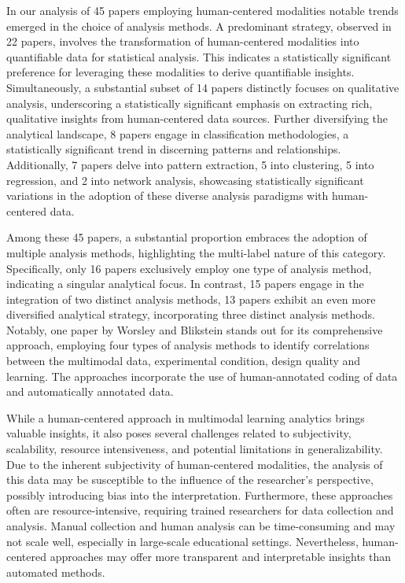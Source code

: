 \documentclass[manuscript,screen,review]{acmart}
\begin{document}
In our analysis of 45 papers employing human-centered modalities notable trends emerged in the choice of analysis methods. A predominant strategy, observed in 22 papers, involves the transformation of human-centered modalities into quantifiable data for statistical analysis. This indicates a statistically significant preference for leveraging these modalities to derive quantifiable insights. Simultaneously, a substantial subset of 14 papers distinctly focuses on qualitative analysis, underscoring a statistically significant emphasis on extracting rich, qualitative insights from human-centered data sources. Further diversifying the analytical landscape, 8 papers engage in classification methodologies, a statistically significant trend in discerning patterns and relationships. Additionally, 7 papers delve into pattern extraction, 5 into clustering, 5 into regression, and 2 into network analysis, showcasing statistically significant variations in the adoption of these diverse analysis paradigms with human-centered data.

Among these 45 papers, a substantial proportion embraces the adoption of multiple analysis methods, highlighting the multi-label nature of this category. Specifically, only 16 papers exclusively employ one type of analysis method, indicating a singular analytical focus. In contrast, 15 papers engage in the integration of two distinct analysis methods, 13 papers exhibit an even more diversified analytical strategy, incorporating three distinct analysis methods. Notably, one paper by Worsley and Blikstein \cite{3095923626} stands out for its comprehensive approach, employing four types of analysis methods to identify correlations between the multimodal data, experimental condition, design quality and learning. The approaches incorporate the use of human-annotated coding of data and automatically annotated data.

While a human-centered approach in multimodal learning analytics brings valuable insights, it also poses several challenges related to subjectivity, scalability, resource intensiveness, and potential limitations in generalizability. Due to the inherent subjectivity of human-centered modalities, the analysis of this data may be susceptible to the influence of the researcher's perspective, possibly introducing bias into the interpretation. Furthermore, these approaches often are resource-intensive, requiring trained researchers for data collection and analysis. Manual collection and human analysis can be time-consuming and may not scale well, especially in large-scale educational settings. Nevertheless, human-centered approaches may offer more transparent and interpretable insights than automated methods.
\end{document}
